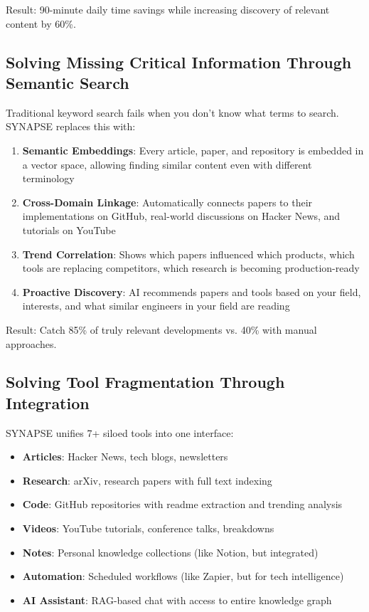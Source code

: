 \documentclass{report}
\begin{document}
Result: 90-minute daily time savings while increasing discovery of relevant content by 60\%.

\subsection{Solving Missing Critical Information Through Semantic Search}

Traditional keyword search fails when you don't know what terms to search. SYNAPSE replaces this with:

\begin{enumerate}
    \item \textbf{Semantic Embeddings}: Every article, paper, and repository is embedded in a vector space, allowing finding similar content even with different terminology
    \item \textbf{Cross-Domain Linkage}: Automatically connects papers to their implementations on GitHub, real-world discussions on Hacker News, and tutorials on YouTube
    \item \textbf{Trend Correlation}: Shows which papers influenced which products, which tools are replacing competitors, which research is becoming production-ready
    \item \textbf{Proactive Discovery}: AI recommends papers and tools based on your field, interests, and what similar engineers in your field are reading
\end{enumerate}

Result: Catch 85\% of truly relevant developments vs. 40\% with manual approaches.

\subsection{Solving Tool Fragmentation Through Integration}

SYNAPSE unifies 7+ siloed tools into one interface:

\begin{itemize}
    \item \textbf{Articles}: Hacker News, tech blogs, newsletters
    \item \textbf{Research}: arXiv, research papers with full text indexing
    \item \textbf{Code}: GitHub repositories with readme extraction and trending analysis
    \item \textbf{Videos}: YouTube tutorials, conference talks, breakdowns
    \item \textbf{Notes}: Personal knowledge collections (like Notion, but integrated)
    \item \textbf{Automation}: Scheduled workflows (like Zapier, but for tech intelligence)
    \item \textbf{AI Assistant}: RAG-based chat with access to entire knowledge graph
\end{itemize}
\end{document}
